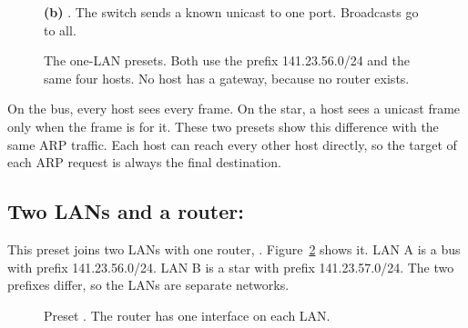 \begin{figure}[htbp]
\begin{minipage}[t]{0.485\linewidth}
\smallskip
{\small \textbf{(b)} . The switch sends a known unicast to one port. Broadcasts go to all.}
\end{minipage}
\caption{The one-LAN presets. Both use the prefix 141.23.56.0/24 and the same four hosts. No host has a gateway, because no router exists.}
\label{fig:t-single}
\end{figure}

On the bus, every host sees every frame. On the star, a host sees a unicast frame only when the frame is for it. These two presets show this difference with the same ARP traffic. Each host can reach every other host directly, so the target of each ARP request is always the final destination.

\subsection{Two LANs and a router: }
This preset joins two LANs with one router, . Figure~\ref{fig:t-two} shows it. LAN A is a bus with prefix 141.23.56.0/24. LAN B is a star with prefix 141.23.57.0/24. The two prefixes differ, so the LANs are separate networks.

\begin{figure}[htbp]
\centering
{}
\caption{Preset . The router has one interface on each LAN.}
\label{fig:t-two}
\end{figure}

